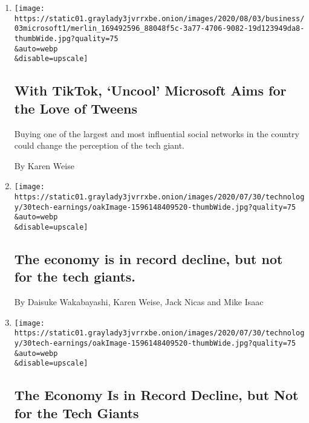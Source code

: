 \begin{enumerate}
\def\labelenumi{\arabic{enumi}.}
\item
  \href{/2020/08/03/technology/tiktok-microsoft-tweens.html}{}

  \texttt{[image: https://static01.graylady3jvrrxbe.onion/images/2020/08/03/business/03microsoft1/merlin\_169492596\_88048f5c-3a77-4706-9082-19d123949da8-thumbWide.jpg?quality=75\\\&auto=webp\\\&disable=upscale]}

  \hypertarget{with-tiktok-uncool-microsoft-aims-for-the-love-of-tweens}{%
  \subsection{With TikTok, `Uncool' Microsoft Aims for the Love of
  Tweens}\label{with-tiktok-uncool-microsoft-aims-for-the-love-of-tweens}}

  Buying one of the largest and most influential social networks in the
  country could change the perception of the tech giant.

  By Karen Weise
\item
  \href{/live/2020/07/31/business/stock-market-today-coronavirus/the-economy-is-in-record-decline-but-not-for-the-tech-giants}{}

  \texttt{[image: https://static01.graylady3jvrrxbe.onion/images/2020/07/30/technology/30tech-earnings/oakImage-1596148409520-thumbWide.jpg?quality=75\\\&auto=webp\\\&disable=upscale]}

  \hypertarget{the-economy-is-in-record-decline-but-not-for-the-tech-giants}{%
  \subsection{The economy is in record decline, but not for the tech
  giants.}\label{the-economy-is-in-record-decline-but-not-for-the-tech-giants}}

  By Daisuke Wakabayashi, Karen Weise, Jack Nicas and Mike Isaac
\item
  \href{/2020/07/30/technology/tech-company-earnings-amazon-apple-facebook-google.html}{}

  \texttt{[image: https://static01.graylady3jvrrxbe.onion/images/2020/07/30/technology/30tech-earnings/oakImage-1596148409520-thumbWide.jpg?quality=75\\\&auto=webp\\\&disable=upscale]}

  \hypertarget{the-economy-is-in-record-decline-but-not-for-the-tech-giants-1}{%
  \subsection{The Economy Is in Record Decline, but Not for the Tech
  Giants}\label{the-economy-is-in-record-decline-but-not-for-the-tech-giants-1}}


\end{enumerate}
